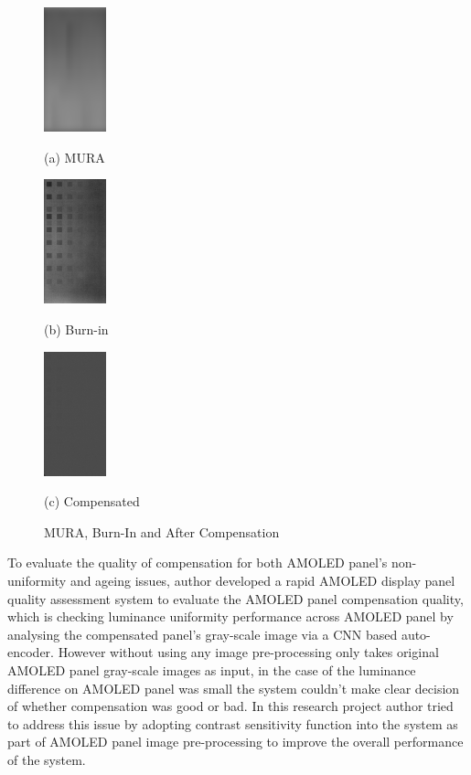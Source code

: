 \documentclass{article}
\begin{document}
\begin{figure}[h]
\begin{minipage}[b]{.3\linewidth}
  \centering
  \centerline{\includegraphics[width=1.8cm]{images/csfed_G_480_I0_PsdLum.png}}
  \centerline{(a) MURA}\medskip
\end{minipage}
\hfill
\begin{minipage}[b]{0.3\linewidth}
  \centering
  \centerline{\includegraphics[width=1.8cm]{images/A1_G_300_I0_PsdLum.csv.png}}
  \centerline{(b) Burn-in }\medskip
\end{minipage}
%
\hfill
\begin{minipage}[b]{0.3\linewidth}
  \centering
  \centerline{\includegraphics[width=1.8cm]{images/A1_G_300_I2_PsdLum.csv.png}}
  \centerline{(c) Compensated}\medskip
\end{minipage}
%
\caption{MURA, Burn-In and After Compensation}
\label{fig1}
%
\end{figure}
To evaluate the quality of compensation for both AMOLED panel's non-uniformity and ageing issues, author developed a rapid AMOLED display panel quality assessment system to evaluate the AMOLED panel compensation quality, which is checking luminance uniformity performance across AMOLED panel by analysing the compensated panel's gray-scale image via a CNN based auto-encoder. However without using any image pre-processing only takes original AMOLED panel gray-scale images as input, in the case of the luminance difference on AMOLED panel was small the system couldn't make clear decision of whether compensation was good or bad.
In this research project author tried to address this issue by adopting contrast sensitivity function into the system as part of AMOLED panel image pre-processing to improve the overall performance of the system. \\
\end{document}

